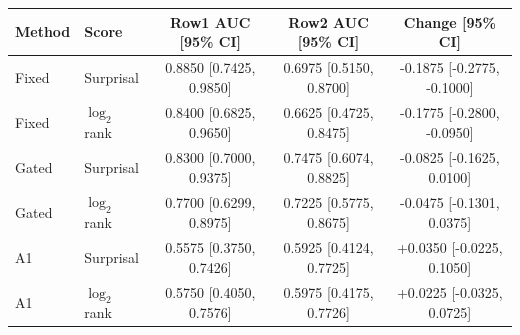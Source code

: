\begin{tabular}{@{}llccc@{}}
\toprule
Method & Score & Row1 AUC [95\% CI] & Row2 AUC [95\% CI] & Change [95\% CI] \\
\midrule
Fixed & Surprisal & 0.8850 [0.7425, 0.9850] & 0.6975 [0.5150, 0.8700] & -0.1875 [-0.2775, -0.1000] \\
Fixed & $\log_2$ rank & 0.8400 [0.6825, 0.9650] & 0.6625 [0.4725, 0.8475] & -0.1775 [-0.2800, -0.0950] \\
Gated & Surprisal & 0.8300 [0.7000, 0.9375] & 0.7475 [0.6074, 0.8825] & -0.0825 [-0.1625, 0.0100] \\
Gated & $\log_2$ rank & 0.7700 [0.6299, 0.8975] & 0.7225 [0.5775, 0.8675] & -0.0475 [-0.1301, 0.0375] \\
A1 & Surprisal & 0.5575 [0.3750, 0.7426] & 0.5925 [0.4124, 0.7725] & +0.0350 [-0.0225, 0.1050] \\
A1 & $\log_2$ rank & 0.5750 [0.4050, 0.7576] & 0.5975 [0.4175, 0.7726] & +0.0225 [-0.0325, 0.0725] \\
\bottomrule
\end{tabular}
